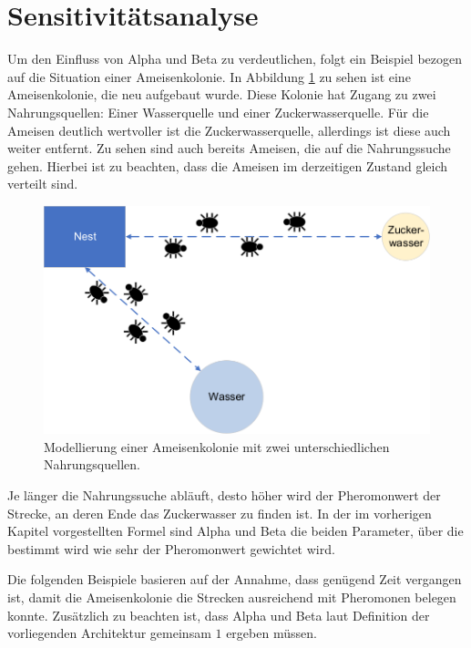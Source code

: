 \section{Sensitivitätsanalyse}{
	\label{analyse}
	Um den Einfluss von Alpha und Beta zu verdeutlichen, folgt ein Beispiel bezogen auf die Situation einer Ameisenkolonie. In Abbildung \ref{parameter_start} zu sehen ist eine Ameisenkolonie, die neu aufgebaut wurde. Diese Kolonie hat Zugang zu zwei Nahrungsquellen: Einer Wasserquelle und einer Zuckerwasserquelle. Für die Ameisen deutlich wertvoller ist die Zuckerwasserquelle, allerdings ist diese auch weiter entfernt. Zu sehen sind auch bereits Ameisen, die auf die Nahrungssuche gehen. Hierbei ist zu beachten, dass die Ameisen im derzeitigen Zustand gleich verteilt sind.
	\begin{figure}[h]
		\centering
		\includegraphics[width=0.9\linewidth]{images/AntAlgorithm_start.png}
		\caption{Modellierung einer Ameisenkolonie mit zwei unterschiedlichen Nahrungsquellen.}
		\label{parameter_start}
	\end{figure}
	Je länger die Nahrungssuche abläuft, desto höher wird der Pheromonwert der Strecke, an deren Ende das Zuckerwasser zu finden ist. In der im vorherigen Kapitel vorgestellten Formel sind Alpha und Beta die beiden Parameter, über die bestimmt wird wie sehr der Pheromonwert gewichtet wird. 
	
	Die folgenden Beispiele basieren auf der Annahme, dass genügend Zeit vergangen ist, damit die Ameisenkolonie die Strecken ausreichend mit Pheromonen belegen konnte.
	Zusätzlich zu beachten ist, dass Alpha und Beta laut Definition der vorliegenden Architektur gemeinsam $1$ ergeben müssen.
	
}
